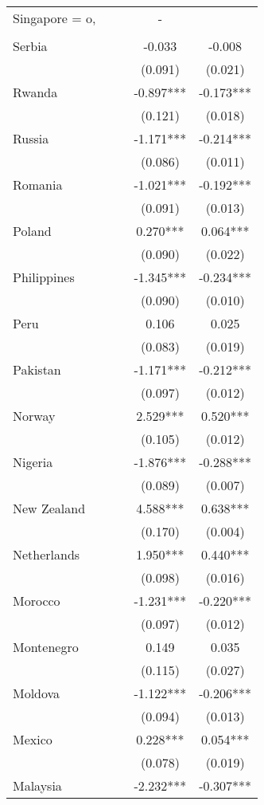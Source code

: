 \documentclass[]{article}
\begin{document}
\begin{tabular}{lcccc}
Singapore = o, &  &  & - &  \\
 &  &  &  &  \\
Serbia &  &  & -0.033 & -0.008 \\
 &  &  & (0.091) & (0.021) \\
Rwanda &  &  & -0.897*** & -0.173*** \\
 &  &  & (0.121) & (0.018) \\
Russia &  &  & -1.171*** & -0.214*** \\
 &  &  & (0.086) & (0.011) \\
Romania &  &  & -1.021*** & -0.192*** \\
 &  &  & (0.091) & (0.013) \\
Poland &  &  & 0.270*** & 0.064*** \\
 &  &  & (0.090) & (0.022) \\
Philippines &  &  & -1.345*** & -0.234*** \\
 &  &  & (0.090) & (0.010) \\
Peru &  &  & 0.106 & 0.025 \\
 &  &  & (0.083) & (0.019) \\
Pakistan &  &  & -1.171*** & -0.212*** \\
 &  &  & (0.097) & (0.012) \\
Norway &  &  & 2.529*** & 0.520*** \\
 &  &  & (0.105) & (0.012) \\
Nigeria &  &  & -1.876*** & -0.288*** \\
 &  &  & (0.089) & (0.007) \\
New Zealand &  &  & 4.588*** & 0.638*** \\
 &  &  & (0.170) & (0.004) \\
Netherlands &  &  & 1.950*** & 0.440*** \\
 &  &  & (0.098) & (0.016) \\
Morocco &  &  & -1.231*** & -0.220*** \\
 &  &  & (0.097) & (0.012) \\
Montenegro &  &  & 0.149 & 0.035 \\
 &  &  & (0.115) & (0.027) \\
Moldova &  &  & -1.122*** & -0.206*** \\
 &  &  & (0.094) & (0.013) \\
Mexico &  &  & 0.228*** & 0.054*** \\
 &  &  & (0.078) & (0.019) \\
Malaysia &  &  & -2.232*** & -0.307*** \\

\end{tabular}
\end{document}
